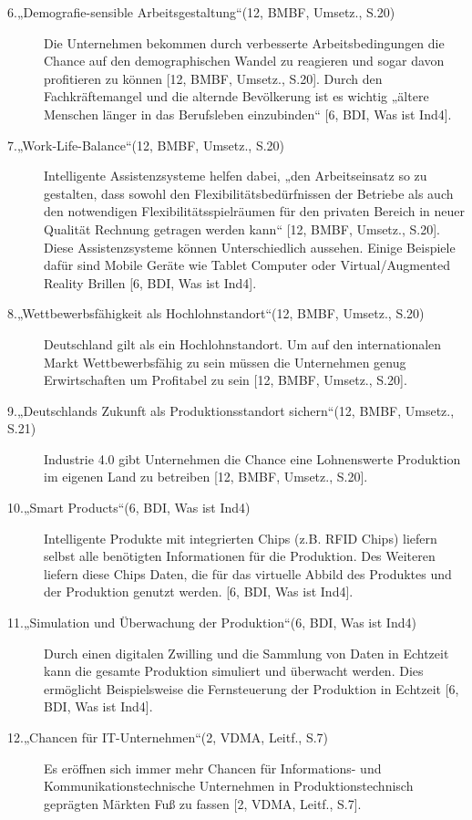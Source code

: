 \begin{description}
	\item[6.„Demografie-sensible Arbeitsgestaltung“(12, BMBF, Umsetz., S.20)]
	
	Die Unternehmen bekommen durch verbesserte Arbeitsbedingungen die Chance auf den 
	demographischen Wandel zu reagieren und sogar davon profitieren zu können [12, BMBF, 
	Umsetz., S.20]. Durch den Fachkräftemangel und die alternde Bevölkerung ist es wichtig 
	„ältere Menschen länger in das Berufsleben einzubinden“ [6, BDI, Was ist Ind4].
	
	\item[7.„Work-Life-Balance“(12, BMBF, Umsetz., S.20)]
	
	Intelligente Assistenzsysteme helfen dabei, „den Arbeitseinsatz so zu gestalten, dass sowohl
	den Flexibilitätsbedürfnissen der Betriebe als auch den notwendigen Flexibilitätsspielräumen
	für den privaten Bereich in neuer Qualität Rechnung getragen werden kann“ [12, BMBF, 
	Umsetz., S.20]. Diese Assistenzsysteme können Unterschiedlich aussehen. Einige Beispiele
	dafür sind Mobile Geräte wie Tablet Computer oder Virtual/Augmented Reality Brillen [6, 
	BDI, Was ist Ind4].
	
	\item[8.„Wettbewerbsfähigkeit als Hochlohnstandort“(12, BMBF, Umsetz., S.20)]
	
	Deutschland gilt als ein Hochlohnstandort. Um auf den internationalen Markt 
	Wettbewerbsfähig zu sein müssen die Unternehmen genug Erwirtschaften um Profitabel
	zu sein [12, BMBF, Umsetz., S.20].
		
	\item[9.„Deutschlands Zukunft als Produktionsstandort sichern“(12, BMBF, Umsetz., S.21)]
	
	Industrie 4.0 gibt Unternehmen die Chance eine Lohnenswerte Produktion im eigenen Land
	zu betreiben [12, BMBF, Umsetz., S.20].
	
	\item[10.„Smart Products“(6, BDI, Was ist Ind4)]
	
	Intelligente Produkte mit integrierten Chips (z.B. RFID Chips) liefern selbst alle benötigten
	Informationen für die Produktion. Des Weiteren liefern diese Chips Daten, die für das
	virtuelle Abbild des Produktes und der Produktion genutzt werden. [6, BDI, Was ist Ind4].
		
	\item[11.„Simulation und Überwachung der Produktion“(6, BDI, Was ist Ind4)]
	
	Durch einen digitalen Zwilling und die Sammlung von Daten in Echtzeit kann die gesamte
	Produktion simuliert und überwacht werden. Dies ermöglicht Beispielsweise die
	Fernsteuerung der Produktion in Echtzeit [6, BDI, Was ist Ind4].
			
	\item[12.„Chancen für IT-Unternehmen“(2, VDMA, Leitf., S.7)]
	
	Es eröffnen sich immer mehr Chancen für Informations- und Kommunikationstechnische
	Unternehmen in Produktionstechnisch geprägten Märkten Fuß zu fassen [2, VDMA, Leitf., 
	S.7].
\end{description}

